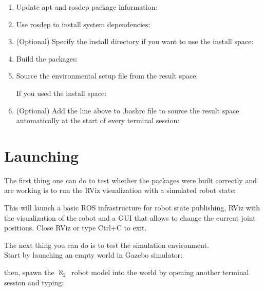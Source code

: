 \documentclass[english,inz,shortabstract]{iithesis}
\newcommand{\rovername}{$\aleph_2$\ }
\begin{document}
{\begin{enumerate}
\item Update \textsf{apt} and \textsf{rosdep} package information:


\item Use \textsf{rosdep} to install system dependencies:


\item (Optional) Specify the install directory if you want to use the install space:


\item Build the packages:


\item Source the environmental setup file from the result space:

If you used the install space:


\item (Optional) Add the line above to \textsf{.bashrc} file to source the result space automatically at the start of every terminal session:


\end{enumerate}

\section{Launching}
The first thing one can do to test whether the packages were built correctly and are working is to run the RViz visualization with a simulated robot state:

This will launch a basic ROS infrastructure for robot state publishing, RViz with the visualization of the robot and a GUI that allows to change the current joint positions. Close RViz or type \textsf{Ctrl+C} to exit.

The next thing you can do is to test the simulation environment.\\
Start by launching an empty world in Gazebo simulator:


then, spawn the \rovername robot model into the world by opening another terminal session and typing: 


}
\end{document}
